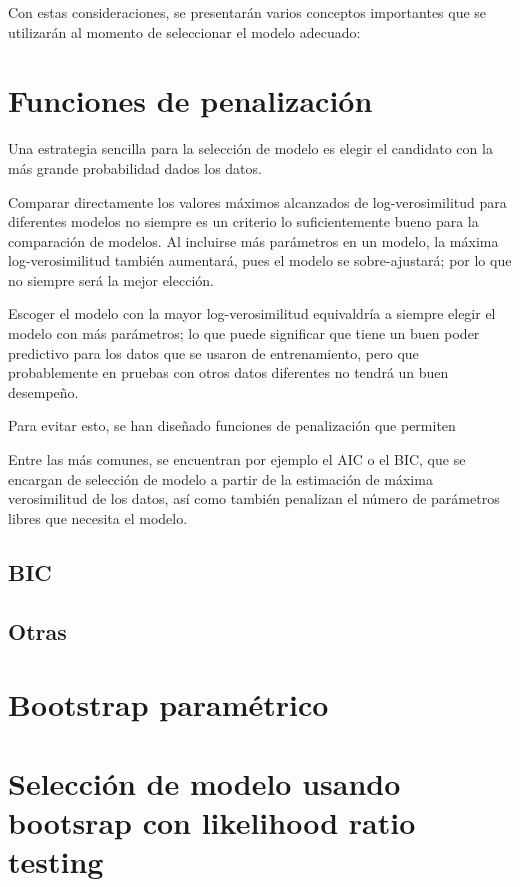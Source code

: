Con estas consideraciones, se presentarán varios conceptos importantes que se utilizarán al momento de seleccionar el modelo adecuado:

\section{Funciones de penalización}

Una estrategia sencilla para la selección de modelo es elegir el candidato con la más grande probabilidad dados los datos. 

Comparar directamente los valores máximos alcanzados de log-verosimilitud para diferentes modelos no siempre es un criterio lo suficientemente bueno para la comparación de modelos. Al incluirse más parámetros en un modelo, la máxima log-verosimilitud también aumentará, pues el modelo se sobre-ajustará; por lo que no siempre será la mejor elección. 

Escoger el modelo con la mayor log-verosimilitud equivaldría a siempre elegir el modelo con más parámetros; lo que puede significar que tiene un buen poder predictivo para los datos que se usaron de entrenamiento, pero que probablemente en pruebas con otros datos diferentes no tendrá un buen desempeño.

Para evitar esto, se han diseñado funciones de penalización que permiten 

Entre las más comunes, se encuentran por ejemplo el \acf{AIC} o el \acf{BIC}, que se encargan de selección de modelo a partir de la estimación de máxima verosimilitud de los datos, así como también penalizan el número de parámetros libres que necesita el modelo.


\subsection{BIC}

\subsection{Otras}

\section{Bootstrap paramétrico}

\section{Selección de modelo usando bootsrap con likelihood ratio testing}

